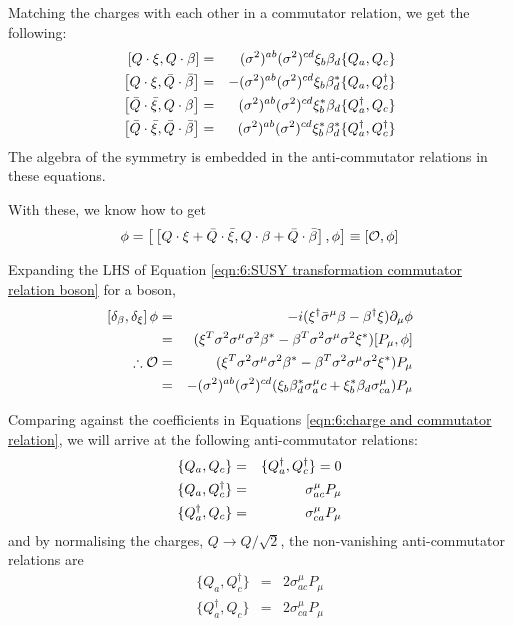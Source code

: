 Matching the charges with each other in a commutator relation, we get the following:
\begin{eqnarray}
    \left[Q\cdot\xi,Q\cdot\beta\right] &=& (\sigma^2)^{ab}(\sigma^2)^{cd} \xi_b \beta_d \{Q_a, Q_c\} \nonext
    \left[Q\cdot\xi, \Bar{Q}\cdot\Bar{\beta}\right] &=& - (\sigma^2)^{ab}(\sigma^2)^{cd} \xi_b \beta^*_d \{Q_a, Q^\dagger_c\} \nonext
    \left[\Bar{Q}\cdot\Bar{\xi}, Q\cdot\beta\right] &=& (\sigma^2)^{ab}(\sigma^2)^{cd} \xi^*_b \beta_d \{Q^\dagger_a, Q_c\} \nonext
    \left[\Bar{Q}\cdot\Bar{\xi}, \Bar{Q}\cdot\Bar{\beta}\right] &=& (\sigma^2)^{ab}(\sigma^2)^{cd} \xi^*_b \beta^*_d \{Q^\dagger_a, Q^\dagger_c\} \label{eqn:6:SUSY charges commutator relation}
\end{eqnarray}
The algebra of the symmetry is embedded in the anti-commutator relations in these equations.

With these, we know how to get
\begin{equation}
    [\delta_\beta, \delta_\xi] \phi = \big[ \left[Q \cdot \xi + \Bar{Q} \cdot \Bar{\xi}, Q \cdot \beta + \Bar{Q} \cdot \Bar{\beta}\right], \phi \big] \equiv [\mathcal{O}, \phi]
    \label{eqn:6:SUSY transformation commutator relation boson}
\end{equation}

Expanding the LHS of Equation \ref{eqn:6:SUSY transformation commutator relation boson} for a boson,
\begin{eqnarray}
    \left[\delta_\beta, \delta_\xi\right] \phi &=& -i (\xi^\dagger \Bar{\sigma}^\mu \beta - \beta^\dagger \xi) \partial_\mu \phi \nonumber \\
    &=& (\xi^T \sigma^2 \sigma^\mu \sigma^2 \beta^*  - \beta^T \sigma^2 \sigma^\mu \sigma^2 \xi^*) [P_\mu, \phi] \nonumber \\
    \therefore \mathcal{O} &=& (\xi^T \sigma^2 \sigma^\mu \sigma^2 \beta^*  - \beta^T \sigma^2 \sigma^\mu \sigma^2 \xi^*) P_\mu \nonumber \\
    &=& -(\sigma^2)^{ab} (\sigma^2)^{cd} (\xi_b \beta^*_d \sigma^\mu_ac + \xi^*_b \beta_d \sigma^\mu_{ca}) P_\mu
\end{eqnarray}

Comparing against the coefficients in Equations \ref{eqn:6:charge and commutator relation}, we will arrive at the following anti-commutator relations:
\begin{eqnarray}
    \{Q_a, Q_c\} &=& \{Q_a^\dagger, Q_c^\dagger\} = 0
    \nonext
    \{Q_a, Q_c^\dagger\} &=& \sigma^\mu_{ac} P_\mu\nonext
    \{Q_a^\dagger, Q_c\} &=& \sigma^\mu_{ca} P_\mu\nonumber
    \label{eqn:6:susy algebra}
\end{eqnarray}
and by normalising the charges, $Q \rightarrow Q/\sqrt{2}$, the non-vanishing anti-commutator relations are
\begin{eqnarray}
    \{Q_a, Q_c^\dagger\} &=& 2 \sigma^\mu_{ac} P_\mu \\
    \label{eqn:6:susy algebra 1}
    \{Q_a^\dagger, Q_c\} &=& 2 \sigma^\mu_{ca} P_\mu 
    \label{eqn:6:susy algebra 2}
\end{eqnarray}

